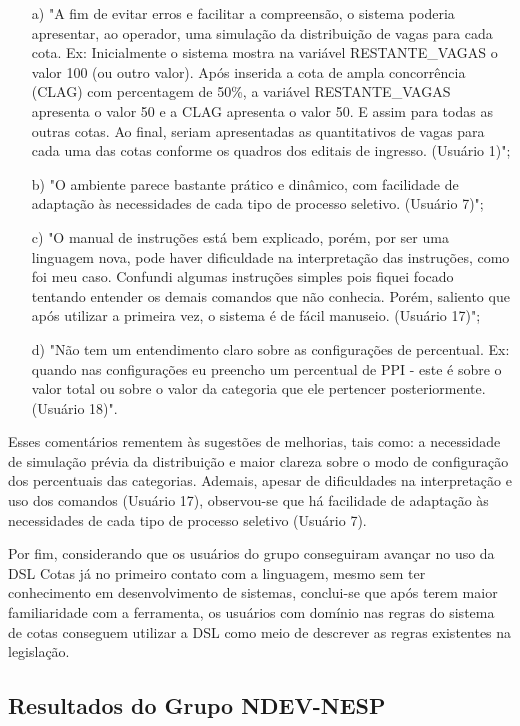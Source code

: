 \begin{enumerate}
    \item [a)] "A fim de evitar erros e facilitar a compreensão, o sistema poderia apresentar, ao operador, uma simulação da distribuição de vagas para cada cota. Ex: Inicialmente o sistema mostra na variável RESTANTE\_VAGAS o valor 100 (ou outro valor). Após inserida a cota de ampla concorrência (CLAG) com percentagem de 50\%, a variável RESTANTE\_VAGAS apresenta o valor 50 e a CLAG apresenta o valor 50. E assim para todas as outras cotas. Ao final, seriam apresentadas as quantitativos de vagas para cada uma das cotas conforme os quadros dos editais de ingresso. (Usuário 1)";
    \item [b)] "O ambiente parece bastante prático e dinâmico, com facilidade de adaptação às necessidades de cada tipo de processo seletivo. (Usuário 7)";    
    \item [c)] "O manual de instruções está bem explicado, porém, por ser uma linguagem nova, pode haver dificuldade na interpretação das instruções, como foi meu caso. Confundi algumas instruções simples pois fiquei focado tentando entender os demais comandos que não conhecia. Porém, saliento que após utilizar a primeira vez, o sistema é de fácil manuseio. (Usuário 17)";   
    \item [d)] "Não tem um entendimento claro sobre as configurações de percentual. Ex: quando nas configurações eu preencho um percentual de PPI -  este é sobre o valor total ou sobre o valor da categoria que ele pertencer posteriormente. (Usuário 18)".
\end{enumerate}

Esses comentários rementem às sugestões de melhorias, tais como: a necessidade de simulação prévia da distribuição e maior clareza sobre o modo de configuração dos percentuais das categorias. Ademais, apesar de dificuldades na interpretação e uso dos comandos (Usuário 17), observou-se que há facilidade de adaptação às necessidades de cada tipo de processo seletivo (Usuário 7).

Por fim, considerando que os usuários do grupo conseguiram avançar no uso da DSL Cotas já no primeiro contato com a linguagem, mesmo sem ter conhecimento em desenvolvimento de sistemas, conclui-se que após terem maior familiaridade com a ferramenta, os usuários com domínio nas regras do sistema de cotas conseguem utilizar a DSL como meio de descrever as regras existentes na legislação.

\newpage
\subsection{Resultados do Grupo NDEV-NESP}
\label{subsec:ndevnesp}

